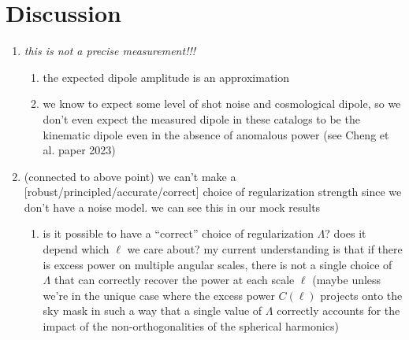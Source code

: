 \documentclass[modern]{aastex631}
\begin{document}
\section{Discussion}
\label{sec:discussion}

\begin{enumerate}
    \item \textit{this is not a precise measurement!!!}
    \begin{enumerate}
        \item the expected dipole amplitude is an approximation
        \item we know to expect some level of shot noise and cosmological dipole, so we don't even expect the measured dipole in these catalogs to be the kinematic dipole even in the absence of anomalous power (see Cheng et al. paper 2023)
    \end{enumerate}
    \item (connected to above point) we can't make a [robust/principled/accurate/correct] choice of regularization strength since we don't have a noise model. we can see this in our mock results
    \begin{enumerate}
        \item is it possible to have a ``correct'' choice of regularization $\Lambda$? does it depend which $\ell$ we care about? my current understanding is that if there is excess power on multiple angular scales, there is not a single choice of $\Lambda$ that can correctly recover the power at each scale $\ell$ (maybe unless we're in the unique case where the excess power $C(\ell)$ projects onto the sky mask in such a way that a single value of $\Lambda$ correctly accounts for the impact of the non-orthogonalities of the spherical harmonics)
    \end{enumerate}
\end{enumerate}


\end{document}
